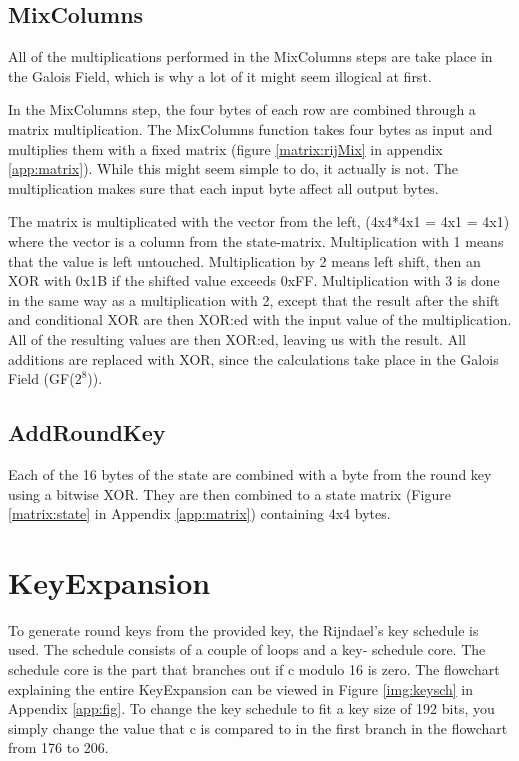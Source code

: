 \subsection{MixColumns}
All of the multiplications performed in the MixColumns steps are 
take place in the Galois Field, which is why a lot of it might seem
illogical at first. 

In the MixColumns step, the four bytes of each row are combined 
through a matrix multiplication. The MixColumns function takes four 
bytes as input and multiplies them with a fixed matrix (figure 
\ref{matrix:rijMix} in appendix \ref{app:matrix}). While this might 
seem simple to do, it actually is not. The multiplication makes sure 
that each input byte affect all output bytes. \citep{Angelfire}

The matrix is multiplicated with the vector from the left, (4x4*4x1 = 
4x1 = 4x1) where the vector is a column from the 
state-matrix. Multiplication with 1 means that the value is left 
untouched. Multiplication by 2 means left shift, then an XOR with 0x1B 
if the shifted value exceeds 0xFF. Multiplication with 3 is done in 
the same way as a multiplication with 2, except that the result after 
the shift and conditional XOR are then XOR:ed with the input value of 
the multiplication. All of the resulting values are then XOR:ed, 
leaving us with the result. All additions are replaced with XOR, since 
the calculations take place in the Galois Field (GF(\(2^8\))).

\subsection{AddRoundKey}\label{sec:AddRoundKey}
Each of the 16 bytes of the state are combined with a byte from the 
round key using a bitwise XOR. They are then combined to a state 
matrix (Figure \ref{matrix:state} in Appendix \ref{app:matrix}) 
containing 4x4 bytes.

\section{KeyExpansion}\label{sec:KeySch}
To generate round keys from the provided key, the Rijndael's key 
schedule is used. The schedule consists of a couple of loops and a key-
schedule core. The schedule core is the part that branches out if c 
modulo 16 is zero. The flowchart explaining the entire KeyExpansion 
can be viewed in Figure \ref{img:keysch} in Appendix \ref{app:fig}. 
To change the key schedule to fit a key size of 192 bits, you simply 
change the value that c is compared to in the first branch in the 
flowchart from 176 to 206.

